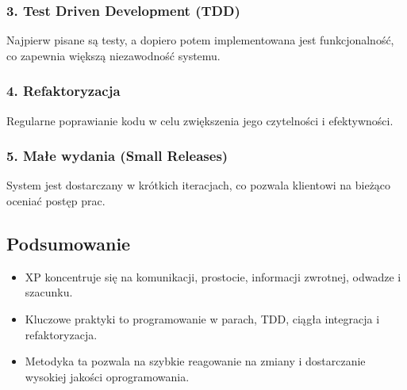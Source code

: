 \subsubsection{3. Test Driven Development (TDD)}
Najpierw pisane są testy, a dopiero potem implementowana jest funkcjonalność, co zapewnia większą niezawodność systemu.

\subsubsection{4. Refaktoryzacja}
Regularne poprawianie kodu w celu zwiększenia jego czytelności i efektywności.

\subsubsection{5. Małe wydania (Small Releases)}
System jest dostarczany w krótkich iteracjach, co pozwala klientowi na bieżąco oceniać postęp prac.

\subsection{Podsumowanie}
\begin{itemize}
    \item XP koncentruje się na komunikacji, prostocie, informacji zwrotnej, odwadze i szacunku.
    \item Kluczowe praktyki to programowanie w parach, TDD, ciągła integracja i refaktoryzacja.
    \item Metodyka ta pozwala na szybkie reagowanie na zmiany i dostarczanie wysokiej jakości oprogramowania.
\end{itemize}
